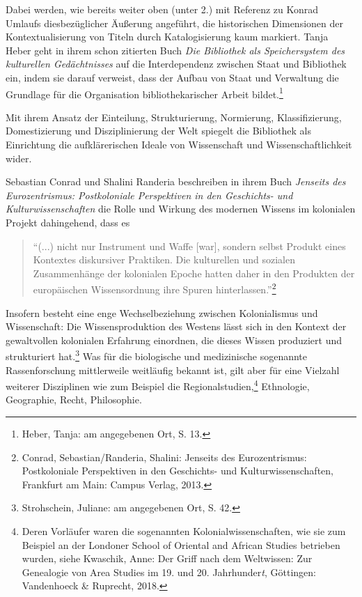 \documentclass[a4paper,
fontsize=11pt,
oneside,
numbers=noperiodatend,
parskip=half-,
bibliography=totoc,
final
]{scrartcl}
\begin{document}
Dabei werden, wie bereits weiter oben (unter 2.) mit Referenz zu Konrad
Umlaufs diesbezüglicher Äußerung angeführt, die historischen Dimensionen
der Kontextualisierung von Titeln durch Katalogisierung kaum markiert.
Tanja Heber geht in ihrem schon zitierten Buch \emph{Die Bibliothek als
Speichersystem des kulturellen Gedächtnisses} auf die Interdependenz
zwischen Staat und Bibliothek ein, indem sie darauf verweist, dass der
Aufbau von Staat und Verwaltung die Grundlage für die Organisation
bibliothekarischer Arbeit bildet.\footnote{Heber, Tanja: am angegebenen
  Ort, S. 13.}

Mit ihrem Ansatz der Einteilung, Strukturierung, Normierung,
Klassifizierung, Domestizierung und Disziplinierung der Welt spiegelt
die Bibliothek als Einrichtung die aufklärerischen Ideale von
Wissenschaft und Wissenschaftlichkeit wider.

Sebastian Conrad und Shalini Randeria beschreiben in ihrem Buch
\emph{Jenseits des Eurozentrismus: Postkoloniale Perspektiven in den
Geschichts- und Kulturwissenschaften} die Rolle und Wirkung des modernen
Wissens im kolonialen Projekt dahingehend, dass es

\begin{quote}
\enquote{(...) nicht nur Instrument und Waffe {[}war{]}, sondern selbst
Produkt eines Kontextes diskursiver Praktiken. Die kulturellen und
sozialen Zusammenhänge der kolonialen Epoche hatten daher in den
Produkten der europäischen Wissensordnung ihre Spuren
hinterlassen.}\footnote{Conrad, Sebastian/Randeria, Shalini: Jenseits
  des Eurozentrismus: Postkoloniale Perspektiven in den Geschichts- und
  Kulturwissenschaften, Frankfurt am Main: Campus Verlag, 2013.}
\end{quote}

Insofern besteht eine enge Wechselbeziehung zwischen Kolonialismus und
Wissenschaft: Die Wissensproduktion des Westens lässt sich in den
Kontext der gewaltvollen kolonialen Erfahrung einordnen, die dieses
Wissen produziert und strukturiert hat.\footnote{Strohschein, Juliane:
  am angegebenen Ort, S. 42.} Was für die biologische und medizinische
sogenannte Rassenforschung mittlerweile weitläufig bekannt ist, gilt
aber für eine Vielzahl weiterer Disziplinen wie zum Beispiel die
Regionalstudien,\footnote{Deren Vorläufer waren die sogenannten
  Kolonialwissenschaften, wie sie zum Beispiel an der Londoner School of
  Oriental and African Studies betrieben wurden, siehe Kwaschik, Anne:
  Der Griff nach dem Weltwissen: Zur Genealogie von Area Studies im 19.
  und 20. Jahrhunder\emph{t}, Göttingen: Vandenhoeck \& Ruprecht, 2018.}
Ethnologie, Geographie, Recht, Philosophie.
\end{document}
